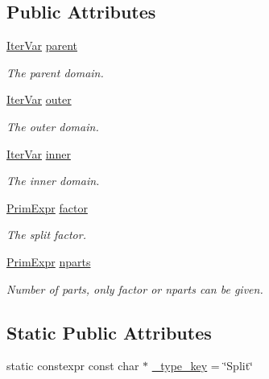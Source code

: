 \subsection*{Public Attributes}
\begin{DoxyCompactItemize}
\item 
\hyperlink{classtvm_1_1tir_1_1IterVar}{Iter\+Var} \hyperlink{classtvm_1_1te_1_1SplitNode_aff313d36c09c8d93ba34aa4a251d6a9f}{parent}
\begin{DoxyCompactList}\small\item\em The parent domain. \end{DoxyCompactList}\item 
\hyperlink{classtvm_1_1tir_1_1IterVar}{Iter\+Var} \hyperlink{classtvm_1_1te_1_1SplitNode_a8d0f3974bbd80f360c717278ec932fbd}{outer}
\begin{DoxyCompactList}\small\item\em The outer domain. \end{DoxyCompactList}\item 
\hyperlink{classtvm_1_1tir_1_1IterVar}{Iter\+Var} \hyperlink{classtvm_1_1te_1_1SplitNode_a54baaf3b5697606521b164b5db7bb8ba}{inner}
\begin{DoxyCompactList}\small\item\em The inner domain. \end{DoxyCompactList}\item 
\hyperlink{classtvm_1_1PrimExpr}{Prim\+Expr} \hyperlink{classtvm_1_1te_1_1SplitNode_a60369ff01e34008f1b3215d7f215b972}{factor}
\begin{DoxyCompactList}\small\item\em The split factor. \end{DoxyCompactList}\item 
\hyperlink{classtvm_1_1PrimExpr}{Prim\+Expr} \hyperlink{classtvm_1_1te_1_1SplitNode_a4e809bca962d95b7fab6a98f1617a05c}{nparts}
\begin{DoxyCompactList}\small\item\em Number of parts, only factor or nparts can be given. \end{DoxyCompactList}\end{DoxyCompactItemize}
\subsection*{Static Public Attributes}
\begin{DoxyCompactItemize}
\item 
static constexpr const char $\ast$ \hyperlink{classtvm_1_1te_1_1SplitNode_aedb5511b8ed87273d74eca6c9643765f}{\+\_\+type\+\_\+key} = \char`\"{}Split\char`\"{}
\end{DoxyCompactItemize}


